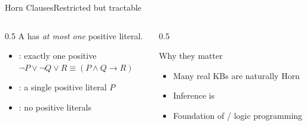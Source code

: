 \documentclass[aspectratio=169,11pt]{beamer}
\begin{document}
\begin{frame}{Horn Clauses}{Restricted but tractable}
  \begin{columns}[T]
    \begin{column}{0.5\textwidth}
      A  has \emph{at most one} positive literal.
      \begin{itemize}\small
        \item {}: exactly one positive \\
          \scriptsize $\neg P \lor \neg Q \lor R \equiv (P \land Q \rightarrow R)$
        \item {}: a single positive literal $P$
        \item {}: no positive literals
      \end{itemize}
    \end{column}
    \begin{column}{0.5\textwidth}
      \begin{exampleblock}{Why they matter}
        \small
        \begin{itemize}
          \item Many real KBs are naturally Horn
          \item Inference is 
          \item Foundation of  / logic programming
        \end{itemize}
      \end{exampleblock}
    \end{column}
  \end{columns}
\end{frame}
\end{document}
